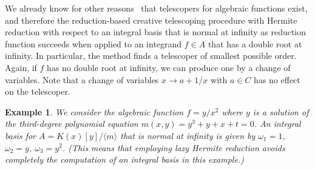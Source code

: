 \documentclass{sig-alternate-05-2015}
\newtheorem{example}[theorem]{Example}
\begin{document}
We already know for other reasons~\cite{Zeilberger1990,chyzak00,chen12d} that
telescopers for algebraic functions exist, and therefore the re\-duc\-tion-based
creative telescoping procedure with Hermite reduction with respect to an
integral basis that is normal at infinity as reduction function succeeds when
applied to an integrand $f\in A$ that has a double root at infinity.
In particular, the method finds a telescoper of smallest possible order.
Again, if $f$ has no double root at infinity, we can produce one by a change of variables.
Note that a change of variables $x\to a+1/x$ with $a\in C$ has no effect on
the telescoper.

\begin{example}\label{ex:ct}
We consider the algebraic function $f=y/x^2$ where $y$ is a solution of the
third-degree polynomial equation $m(x,y) = y^3 + y + x + t = 0$. An integral
basis for $A=K(x)[y]/\langle m\rangle$ that is normal at infinity is given by
$\omega_1=1$, $\omega_2=y$, $\omega_3=y^2$.  (This means that employing lazy
Hermite reduction avoids completely the computation of an integral basis in
this example.)


\end{example}
\end{document}
